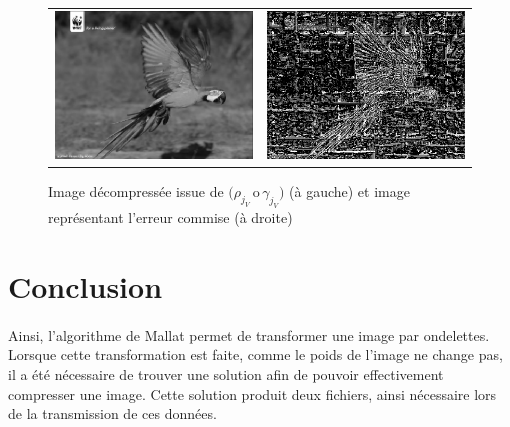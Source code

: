 \documentclass[a4paper,10pt]{report}
\theoremstyle{break}
\begin{document}
      \begin{figure}[!h]

	\begin{tabular}{cc}
	
	  \includegraphics[width = 0.5 \linewidth]{decomp_ara.eps} &
	  \includegraphics[width = 0.5 \linewidth]{error_ara.eps} \\	
	  
	\end{tabular}
	
	\caption{Image d\'{e}compress\'{e}e issue de $\Big(\rho_{j_V} \, $o$ \, \gamma_{j_V}\Big)$ (\`{a} gauche) et
	    image repr\'{e}sentant l'erreur commise (\`{a} droite)}
	
      \end{figure}

\newpage

\section*{Conclusion}

  \paragraph{} Ainsi, l'algorithme de Mallat permet de transformer une image par ondelettes. Lorsque cette transformation est faite,
      comme le poids de l'image ne change pas, il a \'{e}t\'{e} n\'{e}cessaire de trouver une solution afin de pouvoir effectivement
      compresser une image. Cette solution produit deux fichiers, ainsi n\'{e}cessaire lors de la transmission de ces donn\'{e}es.
      
\end{document}
